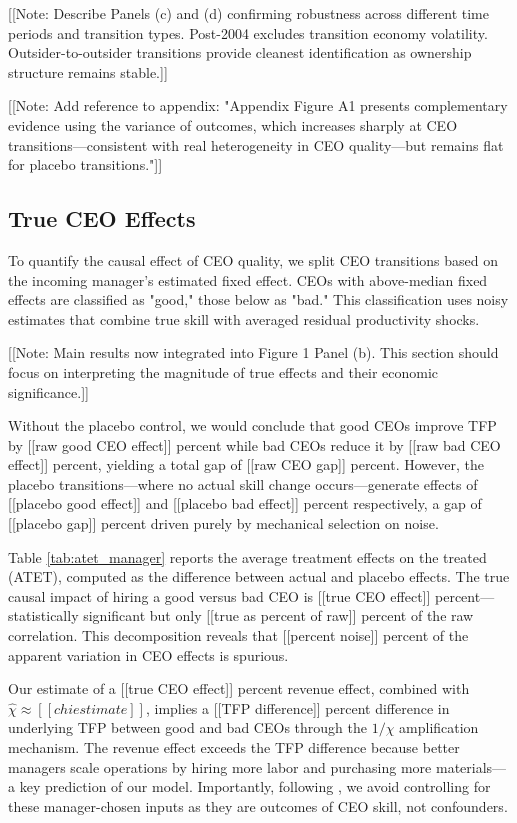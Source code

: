 \documentclass[11pt,a4paper]{article}
\begin{document}
[[Note: Describe Panels (c) and (d) confirming robustness across different time periods and transition types. Post-2004 excludes transition economy volatility. Outsider-to-outsider transitions provide cleanest identification as ownership structure remains stable.]]

[[Note: Add reference to appendix: "Appendix Figure A1 presents complementary evidence using the variance of outcomes, which increases sharply at CEO transitions—consistent with real heterogeneity in CEO quality—but remains flat for placebo transitions."]]

\subsection{True CEO Effects}

To quantify the causal effect of CEO quality, we split CEO transitions based on the incoming manager's estimated fixed effect. CEOs with above-median fixed effects are classified as "good," those below as "bad." This classification uses noisy estimates that combine true skill with averaged residual productivity shocks.

[[Note: Main results now integrated into Figure 1 Panel (b). This section should focus on interpreting the magnitude of true effects and their economic significance.]]

Without the placebo control, we would conclude that good CEOs improve TFP by [[raw good CEO effect]] percent while bad CEOs reduce it by [[raw bad CEO effect]] percent, yielding a total gap of [[raw CEO gap]] percent. However, the placebo transitions—where no actual skill change occurs—generate effects of [[placebo good effect]] and [[placebo bad effect]] percent respectively, a gap of [[placebo gap]] percent driven purely by mechanical selection on noise.

Table \ref{tab:atet_manager} reports the average treatment effects on the treated (ATET), computed as the difference between actual and placebo effects. The true causal impact of hiring a good versus bad CEO is [[true CEO effect]] percent—statistically significant but only [[true as percent of raw]] percent of the raw correlation. This decomposition reveals that [[percent noise]] percent of the apparent variation in CEO effects is spurious.

Our estimate of a [[true CEO effect]] percent revenue effect, combined with $\hat{\chi} \approx [[chi estimate]]$, implies a [[TFP difference]] percent difference in underlying TFP between good and bad CEOs through the $1/\chi$ amplification mechanism. The revenue effect exceeds the TFP difference because better managers scale operations by hiring more labor and purchasing more materials—a key prediction of our model. Importantly, following \citet{Gandhi2020-nu}, we avoid controlling for these manager-chosen inputs as they are outcomes of CEO skill, not confounders.
\end{document}

